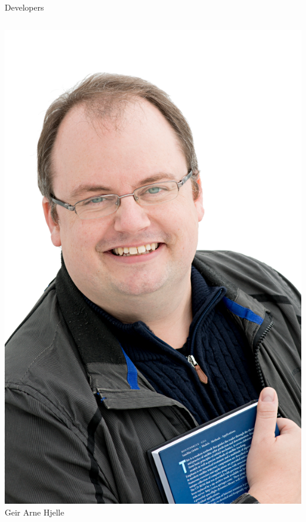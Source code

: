 \documentclass[14pt,c]{beamer}
\begin{document}
\begin{frame}{Developers}
\begin{columns}[t]
    \begin{center}
      \includegraphics[width=\linewidth]{figure/geirarne} \\
      Geir Arne Hjelle
    \end{center}


\end{columns}
\end{frame}
\end{document}
